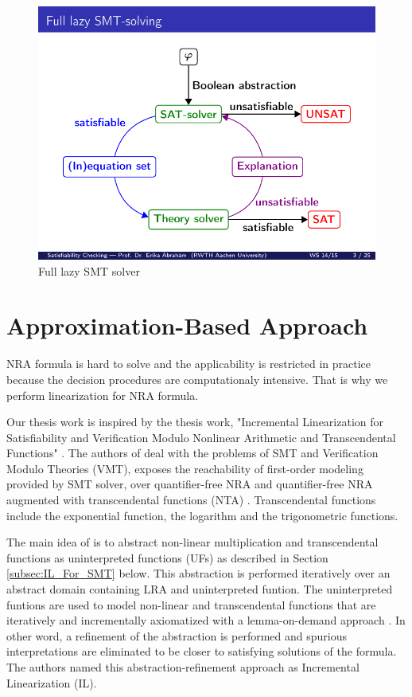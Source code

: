 \begin{figure}[ht!]
  \centering
  \includegraphics[width=0.8\linewidth]{./figures/FullLazySMT.pdf}
  \caption{Full lazy SMT solver \cite{brahm2010ALS}}
  \label{fig:FullLazySMT}
\end{figure}

\section{Approximation-Based Approach}
\label{sec:Approximation_Based_Approach}
NRA formula is hard to solve and the applicability is restricted in practice because the decision procedures are computationaly intensive.
That is why we perform linearization for NRA formula.\newline

\noindent Our thesis work is inspired by the thesis work, "Incremental Linearization for Satisfiability and Verification Modulo Nonlinear Arithmetic and Transcendental Functions" \cite{Cimatti:2018:ILS:3274693.3230639}.
The authors of \cite{Cimatti:2018:ILS:3274693.3230639} deal with the problems of SMT and Verification Modulo Theories (VMT), exposes the reachability of first-order modeling provided by SMT solver, over  quantifier-free NRA and quantifier-free NRA augmented with  transcendental functions (NTA) \cite{abdulla2013reachability}.
Transcendental functions include the exponential function, the logarithm and the trigonometric functions.\newline

\noindent The main idea of \cite{Cimatti:2018:ILS:3274693.3230639} is to abstract non-linear multiplication and transcendental functions as uninterpreted functions (UFs) as described in Section \ref{subsec:IL_For_SMT} below.
This abstraction is performed iteratively over an abstract domain containing LRA and uninterpreted funtion.
The uninterpreted funtions are used to model non-linear and transcendental functions that are iteratively and incrementally axiomatized with a lemma-on-demand approach \cite{Cimatti:2018:ILS:3274693.3230639}.
In other word, a refinement of the abstraction is performed and spurious interpretations are eliminated to be closer to satisfying solutions of the formula.
The authors named this abstraction-refinement approach as Incremental Linearization (IL).\newline

